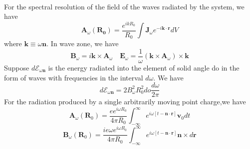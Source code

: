 \\
For the spectral resolution of the field of the waves radiated by the system, we have
\[\bm{A}_{\omega}(\bm{R_0}) =  \frac{e^{ikR_0}}{R_0} \int \bm{J}_{\omega} e^{-i\bm{k}\cdot\bm{r}} dV\]
where $\bm{k} \equiv \omega\bm{n}$.
In wave zone, we have
\[\bm{B}_{\omega} = i\bm{k} \times \bm{A}_{\omega} \quad \bm{E}_{\omega} = \frac{1}{\omega} \left( \bm{k} \times \bm{A}_{\omega}\right) \times \bm{k}\]
Suppose $d\mathcal{E}_{\omega\bm{n}}$ is the energy radiated into the element of solid angle do in the form of waves with frequencies in the interval $d\omega$. We have
\[d\mathcal{E}_{\omega\bm{n}} = 2B_{\omega}^2 R_0^2 do \frac{d\omega}{2\pi}\]
For the radiation produced by a single arbitrarily moving point charge,we have
\[\bm{A}_{\omega}(\bm{R}_0) = \frac{e e^{i\omega
R_0}}{4\pi R_0}  \int_{-\infty}^{\infty} e^{i\omega[
t-\bm{n}\cdot\bm{r}]} \bm{v}_0 dt\]
\[\bm{B}_{\omega}(\bm{R}_0) = \frac{ie\omega e^{i\omega
R_0}}{4\pi R_0}  \int_{-\infty}^{\infty} e^{i\omega[
t-\bm{n}\cdot\bm{r}]}  \bm{n} \times d\bm{r}\]

